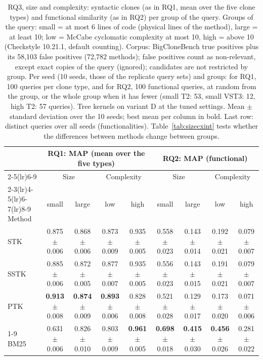 \begin{table}[!htbp]
\centering
\caption{RQ3, size and complexity: syntactic clones (as in RQ1, mean over the five clone types) and functional similarity (as in RQ2) per group of the query. Groups of the query: small = at most 6 lines of code (physical lines of the method), large = at least 10; low = McCabe cyclomatic complexity at most 10, high = above 10 (Checkstyle 10.21.1, default counting). Corpus: BigCloneBench true positives plus its 58,103 false positives (72,782 methods); false positives count as non-relevant, except exact copies of the query (ignored); candidates are not restricted by group. Per seed (10 seeds, those of the replicate query sets) and group: for RQ1, 100 queries per clone type, and for RQ2, 100 functional queries, at random from the group, or the whole group when it has fewer (small T2: 53, small VST3: 12, high T2: 57 queries). Tree kernels on variant D at the tuned settings. Mean $\pm$ standard deviation over the 10 seeds; best mean per column in bold. Last row: distinct queries over all seeds (functionalities). Table~\ref{tab:sizecxint} tests whether the differences between methods change between groups.}
\label{tab:sizecx}
\scriptsize
\setlength{\tabcolsep}{3pt}
\begin{tabular}{lcccccccc}
\toprule
 & \multicolumn{4}{c}{RQ1: MAP (mean over the five types)} & \multicolumn{4}{c}{RQ2: MAP (functional)} \\ \cmidrule(lr){2-5}\cmidrule(lr){6-9}
 & \multicolumn{2}{c}{Size} & \multicolumn{2}{c}{Complexity} & \multicolumn{2}{c}{Size} & \multicolumn{2}{c}{Complexity} \\ \cmidrule(lr){2-3}\cmidrule(lr){4-5}\cmidrule(lr){6-7}\cmidrule(lr){8-9}
Method & small & large & low & high & small & large & low & high \\
\midrule
\quad STK & 0.875$\pm$0.006 & 0.868$\pm$0.006 & 0.873$\pm$0.009 & 0.935$\pm$0.005 & 0.558$\pm$0.023 & 0.143$\pm$0.014 & 0.192$\pm$0.021 & 0.079$\pm$0.007 \\
\quad SSTK & 0.885$\pm$0.006 & 0.872$\pm$0.005 & 0.877$\pm$0.007 & 0.935$\pm$0.005 & 0.556$\pm$0.023 & 0.143$\pm$0.015 & 0.191$\pm$0.021 & 0.079$\pm$0.007 \\
\quad PTK & \textbf{0.913}$\pm$0.008 & \textbf{0.874}$\pm$0.009 & \textbf{0.893}$\pm$0.006 & 0.828$\pm$0.008 & 0.521$\pm$0.028 & 0.129$\pm$0.017 & 0.173$\pm$0.020 & 0.071$\pm$0.006 \\
\cmidrule(lr){1-9}
\quad BM25 & 0.631$\pm$0.006 & 0.826$\pm$0.010 & 0.803$\pm$0.009 & \textbf{0.961}$\pm$0.005 & \textbf{0.698}$\pm$0.018 & \textbf{0.415}$\pm$0.030 & \textbf{0.456}$\pm$0.026 & 0.281$\pm$0.022 \\

\end{tabular}
\end{table}

